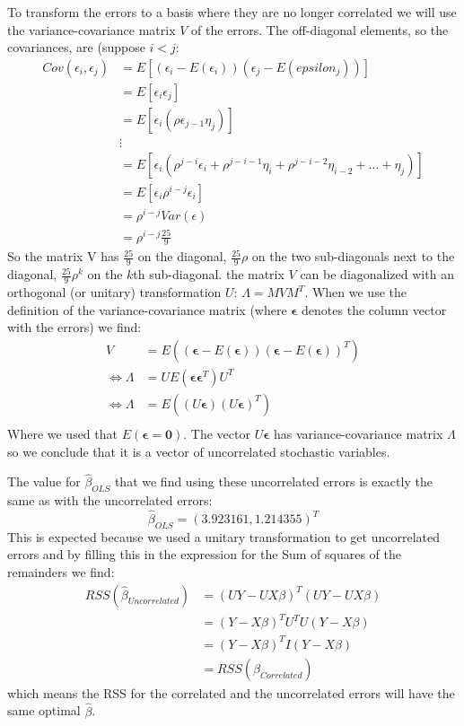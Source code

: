 \documentclass[a4paper]{article}
\begin{document}
To transform the errors to a basis where they are no longer correlated we will use the variance-covariance matrix $V$ of the errors. 
The off-diagonal elements, so the covariances, are (suppose $i < j$:
\begin{align*}
	Cov(\epsilon_i, \epsilon_j) &= E[(\epsilon_i-E(\epsilon_i))(\epsilon_j-E(epsilon_j))]\\
				    &= E[\epsilon_i \epsilon_j]\\
				    &= E[\epsilon_i (\rho\epsilon_{j-1} \eta_j)]\\
				    &\vdots\\
				    &= E[\epsilon_i (\rho^{j-i} \epsilon_i + \rho^{j-i-1}\eta_i + \rho^{j-i-2}\eta_{i-2} + \ldots + \eta_j)]\\
				    &= E[\epsilon_i \rho^{i-j} \epsilon_i]\\
				    &= \rho^{i-j} Var(\epsilon)\\
				    &= \rho^{i-j} \frac{25}{9}
\end{align*}
So the matrix V has $ \frac{25}{9}$ on the diagonal, $ \frac{25}{9}\rho $ on the two sub-diagonals next to the diagonal, $ \frac{25}{9} \rho^k$ on the $k$th sub-diagonal.
the matrix $V$ can be diagonalized with an orthogonal (or unitary) transformation $U$: $\Lambda = MVM^T$. When we use the definition of the variance-covariance matrix (where $\mathbf{\epsilon}$ denotes the column vector with the errors) we find:
\begin{align*}
	V &= E( (\mathbf{\epsilon} - E(\mathbf{\epsilon})) (\mathbf{\epsilon} - E(\mathbf{\epsilon}))^T)\\
	\Leftrightarrow \Lambda &= U E( \mathbf{\epsilon} \mathbf{\epsilon}^T) U^T\\
	\Leftrightarrow \Lambda &= E( (U\mathbf{\epsilon})(U\mathbf{\epsilon})^T)\\
\end{align*}
Where we used that $E(\mathbf{\epsilon} = \mathbf{0})$. The vector $U \mathbf{\epsilon}$ has variance-covariance matrix $\Lambda$ so we conclude that it is a vector of uncorrelated stochastic variables.

The value for $\hat{\beta}_{OLS}$ that we find using these uncorrelated errors is exactly the same as with the uncorrelated errors:
\begin{equation*}
	\hat{\beta}_{OLS} = (3.923161, 1.214355)^T
\end{equation*}
This is expected because we used a unitary transformation to get uncorrelated errors and by filling this in the expression for the Sum of squares of the remainders we find:
\begin{align*}
	RSS(\hat{\beta}_{Uncorrelated}) &= (UY-UX\beta)^T(UY-UX\beta)\\
		   &= (Y-X\beta)^T U^T U (Y-X\beta)\\
		   &= (Y-X\beta)^T I (Y-X\beta)\\
		   &= RSS(\hat{\beta}_{Correlated})
\end{align*}
which means the RSS for the correlated and the uncorrelated errors will have the same optimal $\hat{\beta}$.
\end{document}
